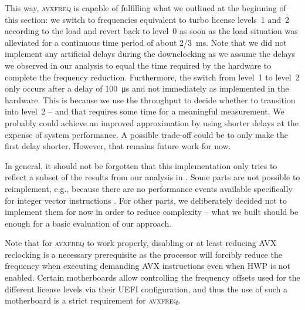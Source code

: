 This way, \textsc{avxfreq} is capable of fulfilling what we outlined at the beginning of this section: we switch to frequencies equivalent to turbo license levels~1 and~2 according to the load and revert back to level~0 as soon as the load situation was alleviated for a continuous time period of about \SI[quotient-mode=fraction]{2/3}{\milli\second}. Note that we did not implement any artificial delays during the downclocking as we assume the delays we observed in our analysis to equal the time required by the hardware to complete the frequency reduction. Furthermore, the switch from level~1 to level~2 only occurs after a delay of \SI{100}{\micro\second} and not immediately as implemented in the hardware. This is because we use the throughput to decide whether to transition into level~2 -- and that requires some time for a meaningful measurement. We probably could achieve an improved approximation by using shorter delays at the expense of system performance. A possible trade-off could be to only make the first delay shorter. However, that remains future work for now.

In general, it should not be forgotten that this implementation only tries to reflect a subset of the results from our analysis in . Some parts are not possible to reimplement, e.g., because there are no performance events available specifically for integer vector instructions \cite{intelsdmsysprogguide}. For other parts, we deliberately decided not to implement them for now in order to reduce complexity -- what we built should be enough for a basic evaluation of our approach.

Note that for \textsc{avxfreq} to work properly, disabling or at least reducing \gls{AVX} reclocking is a necessary prerequisite as the processor will forcibly reduce the frequency when executing demanding \gls{AVX} instructions even when \gls{HWP} is not enabled. Certain motherboards allow controlling the frequency offsets used for the different license levels via their \gls{UEFI} configuration, and thus the use of such a motherboard is a strict requirement for \textsc{avxfreq}.

